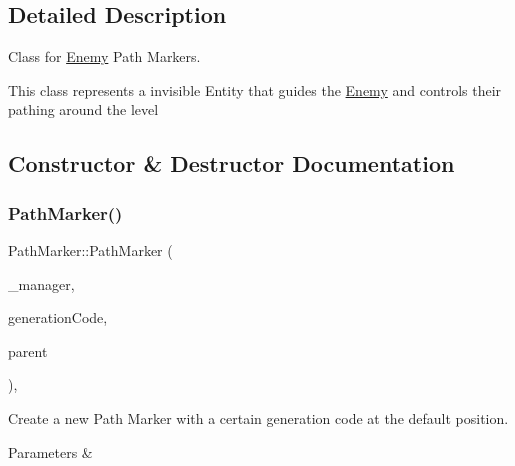 \subsection{Detailed Description}
Class for \mbox{\hyperlink{class_enemy}{Enemy}} Path Markers. 

This class represents a invisible Entity that guides the \mbox{\hyperlink{class_enemy}{Enemy}} and controls their pathing around the level 

\subsection{Constructor \& Destructor Documentation}
\mbox{\label{class_path_marker_a99f9729d5c1377a57e3266e3ab1c0ac9}} 
\subsubsection{\texorpdfstring{PathMarker()}{PathMarker()}\hspace{0.1cm}{\footnotesize\ttfamily [1/3]}}
{\footnotesize\ttfamily Path\+Marker\+::\+Path\+Marker (\begin{DoxyParamCaption}\item[{\mbox{\hyperlink{class_game_manager}{Game\+Manager}} $\ast$}]{\+\_\+manager,  }\item[{int}]{generation\+Code,  }\item[{\mbox{\hyperlink{class_game_entity}{Game\+Entity}} $\ast$}]{parent }\end{DoxyParamCaption})\hspace{0.3cm}{\ttfamily [inline]}, {\ttfamily [private]}}



Create a new Path Marker with a certain generation code at the default position. 


\begin{DoxyParams}{Parameters}
{\em } & \\
\hline
\end{DoxyParams}
\mbox{\label{class_path_marker_ae1bd502fd20fff6f8bbc74cbe79352ad}} 
